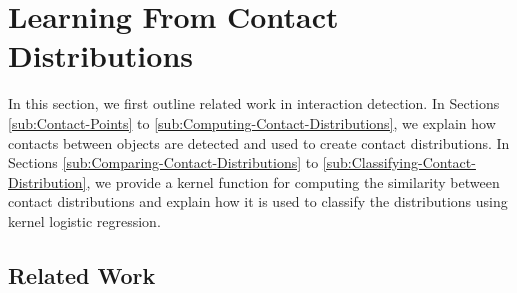 %



\section{Learning From Contact Distributions\label{sec:Classifying-Object-Interactions}}

In this section, we first outline related work in interaction detection.
In Sections \ref{sub:Contact-Points} to \ref{sub:Computing-Contact-Distributions},
we explain how contacts between objects are detected and used to create
contact distributions. In Sections \ref{sub:Comparing-Contact-Distributions}
to \ref{sub:Classifying-Contact-Distribution}, we provide a kernel
function for computing the similarity between contact distributions
and explain how it is used to classify the distributions using kernel
logistic regression. 


\subsection{Related Work}


